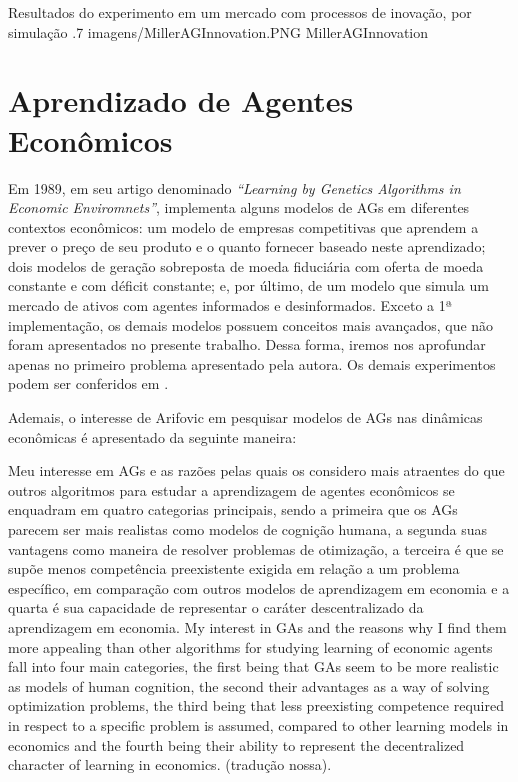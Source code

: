 \figura
	{Resultados do experimento em um mercado com processos de inovação, por simulação}
	{.7}
	{imagens/MillerAGInnovation.PNG}
	{MillerAGInnovation}
	{}
	
\section{Aprendizado de Agentes Econômicos}

Em 1989, em seu artigo denominado \textit{\enquote{Learning by Genetics Algorithms in Economic Enviromnets}},   implementa alguns modelos de AGs em diferentes contextos econômicos: um modelo de empresas competitivas que aprendem a prever o preço de seu produto e o quanto fornecer baseado neste aprendizado; dois modelos de geração sobreposta de moeda fiduciária com oferta de moeda constante e com déficit constante; e, por último, de um modelo que simula um mercado de ativos com agentes informados e desinformados. Exceto a 1ª implementação, os demais modelos possuem conceitos mais avançados, que não foram apresentados no presente trabalho. Dessa forma, iremos nos aprofundar apenas no primeiro problema apresentado pela autora. Os demais experimentos podem ser conferidos em .

Ademais, o interesse de Arifovic em pesquisar modelos de AGs nas dinâmicas econômicas é apresentado da seguinte maneira:

\citacao
	{%
		Meu interesse em AGs e as razões pelas quais os considero mais atraentes do que outros algoritmos para estudar a aprendizagem de agentes econômicos se enquadram em quatro categorias principais, sendo a primeira que os AGs parecem ser mais realistas como modelos de cognição humana, a segunda suas vantagens como maneira de resolver problemas de otimização, a terceira é que se supõe menos competência preexistente exigida em relação a um problema específico, em comparação com outros modelos de aprendizagem em economia e a quarta é sua capacidade de representar o caráter descentralizado da aprendizagem em economia.
	}{%
		My interest in GAs and the reasons why I find them more appealing than other algorithms for studying learning of economic agents fall into four main categories, the first being that GAs seem to be more realistic as models of human cognition, the second their advantages as a way of solving optimization problems, the third being that less preexisting competence required in respect to a specific problem is assumed, compared to other learning models in economics and the fourth being their ability to represent the decentralized character of learning in economics.
	}
	{\citep[p.1]{arifovic_1989}}
	{(tradução nossa).}

